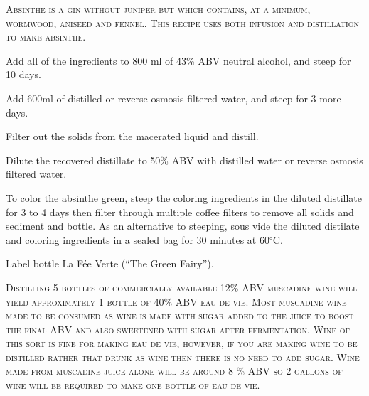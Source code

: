\documentclass[letterpaper]{recipePMG}
\renewcommand{\deg}{$^\circ$}
\begin{document}
\newpage
{} 
\label{Absinthe}


    
\textsc{Absinthe is a gin without juniper but which contains, at a minimum, wormwood, aniseed and fennel. This recipe uses both infusion and distillation to make absinthe.}

Add all of the ingredients to 800 ml of 43\% ABV neutral alcohol, and steep for 10 days.

Add 600ml of distilled or reverse osmosis filtered water, and steep for 3 more days.

Filter out the solids from the macerated liquid and distill.

Dilute the recovered distillate to 50\% ABV with distilled water or reverse osmosis filtered water.

To color the absinthe green, steep the coloring ingredients in the diluted distillate for 3 to 4 days then filter through multiple coffee filters to remove all solids and sediment and bottle. As an alternative to steeping, sous vide the diluted distilate and coloring ingredients in a sealed bag for 30 minutes at 60\deg C.

Label bottle La F\'{e}e Verte (``The Green Fairy'').


\newpage



\textsc{Distilling 5 bottles of commercially available 12\% ABV muscadine wine will yield approximately 1 bottle of 40\% ABV eau de vie. Most muscadine wine made to be consumed as wine is made with sugar added to the juice to boost the final ABV and also sweetened with sugar after fermentation. Wine of this sort is fine for making eau de vie, however, if you are making wine to be distilled rather that drunk as wine then there is no need to add sugar. Wine made from muscadine juice alone will be around 8 \% ABV so 2 gallons of wine will be required to make one bottle of eau de vie.} 
\end{document}
